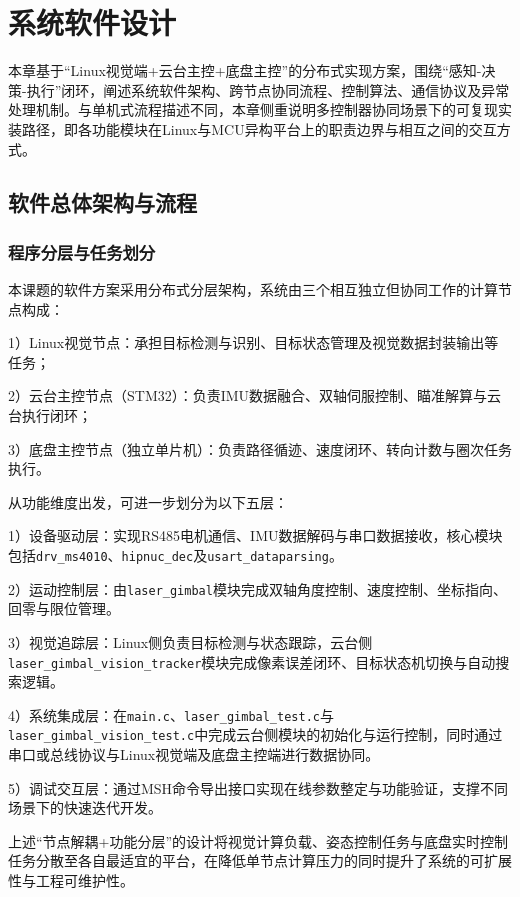 \chapter{系统软件设计}

本章基于``Linux视觉端+云台主控+底盘主控''的分布式实现方案，围绕``感知-决策-执行''闭环，阐述系统软件架构、跨节点协同流程、控制算法、通信协议及异常处理机制。与单机式流程描述不同，本章侧重说明多控制器协同场景下的可复现实装路径，即各功能模块在Linux与MCU异构平台上的职责边界与相互之间的交互方式。

\section{软件总体架构与流程}

\subsection{程序分层与任务划分}

本课题的软件方案采用分布式分层架构，系统由三个相互独立但协同工作的计算节点构成：

1）Linux视觉节点：承担目标检测与识别、目标状态管理及视觉数据封装输出等任务；

2）云台主控节点（STM32）：负责IMU数据融合、双轴伺服控制、瞄准解算与云台执行闭环；

3）底盘主控节点（独立单片机）：负责路径循迹、速度闭环、转向计数与圈次任务执行。

从功能维度出发，可进一步划分为以下五层：

1）设备驱动层：实现RS485电机通信、IMU数据解码与串口数据接收，核心模块包括\texttt{drv\_ms4010}、\texttt{hipnuc\_dec}及\texttt{usart\_dataparsing}。

2）运动控制层：由\texttt{laser\_gimbal}模块完成双轴角度控制、速度控制、坐标指向、回零与限位管理。

3）视觉追踪层：Linux侧负责目标检测与状态跟踪，云台侧\texttt{laser\_gimbal\_vision\_tracker}模块完成像素误差闭环、目标状态机切换与自动搜索逻辑。

4）系统集成层：在\texttt{main.c}、\texttt{laser\_gimbal\_test.c}与\texttt{laser\_gimbal\_vision\_test.c}中完成云台侧模块的初始化与运行控制，同时通过串口或总线协议与Linux视觉端及底盘主控端进行数据协同。

5）调试交互层：通过MSH命令导出接口实现在线参数整定与功能验证，支撑不同场景下的快速迭代开发。

上述``节点解耦+功能分层''的设计将视觉计算负载、姿态控制任务与底盘实时控制任务分散至各自最适宜的平台，在降低单节点计算压力的同时提升了系统的可扩展性与工程可维护性。

